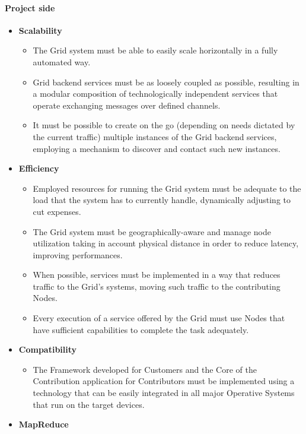 \paragraph{Project side}
\begin{itemize}
    \item \textbf{Scalability}
    \begin{itemize}
        \item The Grid system must be able to easily scale horizontally in a fully automated way.
        \item Grid backend services must be as loosely coupled as possible, resulting in a modular composition of technologically independent services that operate exchanging messages over defined channels.
        \item It must be possible to create on the go (depending on needs dictated by the current traffic) multiple instances of the Grid backend services, employing a mechanism to discover and contact such new instances.
    \end{itemize}
    \item \textbf{Efficiency}
    \begin{itemize}
        \item Employed resources for running the Grid system must be adequate to the load that the system has to currently handle, dynamically adjusting to cut expenses.
        \item The Grid system must be geographically-aware and manage node utilization taking in account physical distance in order to reduce latency, improving performances.
        \item When possible, services must be implemented in a way that reduces traffic to the Grid’s systems, moving such traffic to the contributing Nodes.
        \item Every execution of a service offered by the Grid must use Nodes that have sufficient capabilities to complete the task adequately.
    \end{itemize}
    \item \textbf{Compatibility}
    \begin{itemize}
        \item The Framework developed for Customers and the Core of the Contribution application for Contributors must be implemented using a technology that can be easily integrated in all major Operative Systems that run on the target devices.
    \end{itemize}
    \item \textbf{MapReduce}

\end{itemize}
